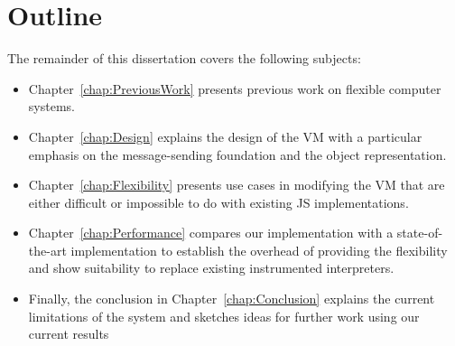 \section{Outline}

The remainder of this dissertation covers the following subjects: 
\begin{itemize}
    \item Chapter~\ref{chap:PreviousWork} presents previous work on flexible computer systems.
    \item Chapter~\ref{chap:Design} explains the design of the VM with a
        particular emphasis on the message-sending foundation and the object
        representation.
    \item Chapter~\ref{chap:Flexibility} presents use cases in modifying the VM
        that are either difficult or impossible to do with existing JS
        implementations.
    \item Chapter~\ref{chap:Performance} compares our implementation with a
        state-of-the-art implementation to establish the overhead of providing
        the flexibility and show suitability to replace existing instrumented
        interpreters.
    \item Finally, the conclusion in Chapter~\ref{chap:Conclusion} explains the
        current limitations of the system and sketches ideas for further work
        using our current results
\end{itemize}
